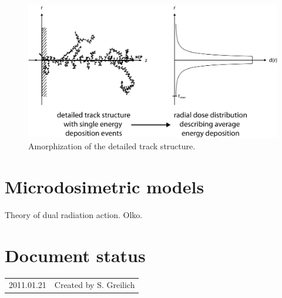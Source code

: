 \begin{figure}
	\centering
		\includegraphics[width=1.0\textwidth]{pictures/TrackStructureDetailAndRDD.png}
	\caption{Amorphization of the detailed track structure.}
	\label{fig:TST}
\end{figure}


\section{Microdosimetric models}

Theory of dual radiation action.
Olko.

\section*{Document status}
\begin{tabular}{l l}
2011.01.21&Created by S. Greilich
\end{tabular} 